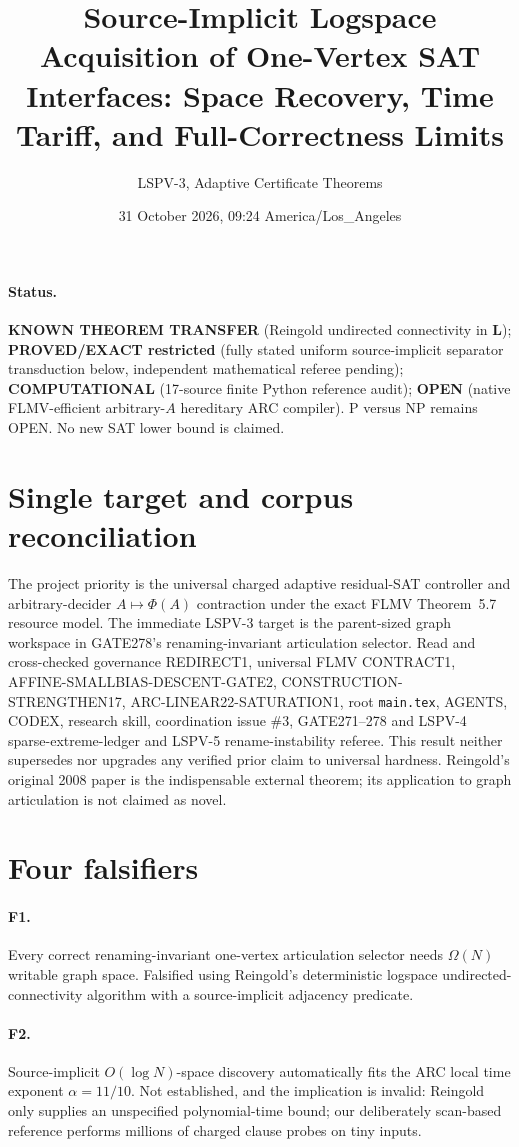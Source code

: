 \documentclass[11pt]{article}
\title{Source-Implicit Logspace Acquisition of One-Vertex SAT Interfaces: Space Recovery, Time Tariff, and Full-Correctness Limits}
\author{LSPV-3, Adaptive Certificate Theorems}
\date{31 October 2026, 09:24 America/Los\_Angeles}
\begin{document}
\maketitle
\paragraph{Status.} \textbf{KNOWN THEOREM TRANSFER} (Reingold undirected connectivity in $\mathbf L$); \textbf{PROVED/EXACT restricted} (fully stated uniform source-implicit separator transduction below, independent mathematical referee pending); \textbf{COMPUTATIONAL} (17-source finite Python reference audit); \textbf{OPEN} (native FLMV-efficient arbitrary-$A$ hereditary ARC compiler). P versus NP remains OPEN. No new SAT lower bound is claimed.

\section{Single target and corpus reconciliation}
The project priority is the universal charged adaptive residual-SAT controller and arbitrary-decider $A\mapsto\Phi(A)$ contraction under the exact FLMV Theorem~5.7 resource model. The immediate LSPV-3 target is the parent-sized graph workspace in GATE278's renaming-invariant articulation selector. Read and cross-checked governance REDIRECT1, universal FLMV CONTRACT1, AFFINE-SMALLBIAS-DESCENT-GATE2, CONSTRUCTION-STRENGTHEN17, ARC-LINEAR22-SATURATION1, root \texttt{main.tex}, AGENTS, CODEX, research skill, coordination issue \#3, GATE271--278 and LSPV-4 sparse-extreme-ledger and LSPV-5 rename-instability referee. This result neither supersedes nor upgrades any verified prior claim to universal hardness. Reingold's original 2008 paper is the indispensable external theorem; its application to graph articulation is not claimed as novel.

\section{Four falsifiers}
\paragraph{F1.} Every correct renaming-invariant one-vertex articulation selector needs $\Omega(N)$ writable graph space. Falsified using Reingold's deterministic logspace undirected-connectivity algorithm with a source-implicit adjacency predicate.
\paragraph{F2.} Source-implicit $O(\log N)$-space discovery automatically fits the ARC local time exponent $\alpha=11/10$. Not established, and the implication is invalid: Reingold only supplies an unspecified polynomial-time bound; our deliberately scan-based reference performs millions of charged clause probes on tiny inputs.
\end{document}
